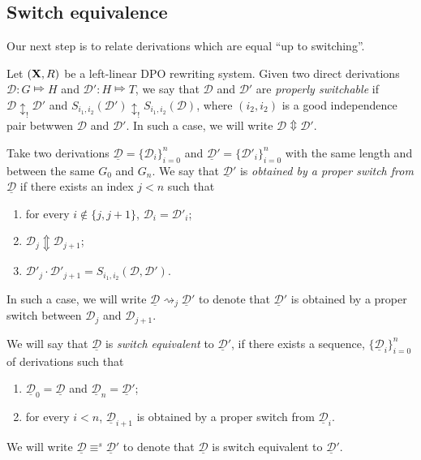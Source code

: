 \documentclass[a4paper,UKenglish,cleveref,pdftex, thm-restate,numberwithinsect]{lipics}
\def\R{\mathsf{R}}
\def\X{\textbf {\textup{X}}}
\newcommand{\dder}[1]{\mathscr{#1}}
\newcommand{\der}[1]{\underline{\dder{#1}}}
\begin{document}
\subsection{Switch equivalence}

Our next step is to relate derivations which are equal ``up to switching''.

\begin{definition}
	\label{de:switchable}
	Let $(\X, \R)$ be a left-linear DPO rewriting system. Given two
	direct derivations $\dder{D}\colon G\Mapsto H$ and
	$\dder{D}'\colon H\Mapsto T$, we say that $\dder{D}$ and $\dder{D}'$
	are \emph{properly switchable} if $\dder{D}\updownarrow_! \dder{D'}$
	and $S_{i_1,i_2}(\dder{D}')\updownarrow_!S_{i_1,i_2}(\dder{D})$,
	where $(i_2,i_2)$ is a good independence pair betwwen $\dder{D}$ and
	$\dder{D}'$. In such a case, we will write
	$\dder{D}\Updownarrow\dder{D}'$.
	
	Take two derivations $\der{D}=\{\dder{D}_{i}\}_{i=0}^n$ and $\der{D}'=\{\dder{D}'_{i}\}_{i=0}^n$ with the same length and between the same $G_0$ and $G_n$. We say that $\der{D}'$ is \emph{obtained by a proper switch from $\der{D}$} if there exists an index $j < n$ such that
	\begin{enumerate}
		\item for every $i\notin \{j, j+1\} $, $\dder{D}_i=\dder{D}'_i$;
		\item $\dder{D}_j \Updownarrow \dder{D}_{j+1}$;		
		\item $\dder{D}'_j\cdot \dder{D}'_{j+1} = S_{i_1,i_2}(\dder{D}, \dder{D}')$.
	\end{enumerate}
	In such a case, we will write $\der{D}\rightsquigarrow_j \der{D}'$ to denote that $\der{D}'$ is obtained by a proper switch between $\dder{D}_j$ and $\dder{D}_{j+1}$. 
	
	We will say that $\der{D}$ is \emph{switch equivalent} to $\der{D}'$, if there exists a sequence, $\{\der{D}_i\}_{i=0}^n$ of derivations such that
	\begin{enumerate}
		\item $\der{D}_0=\der{D}$ and $\der{D}_n=\der{D}'$;
		\item for every $i< n$, $\der{D}_{i+1}$ is obtained by a proper switch from $\der{D}_i$.
	\end{enumerate}
	
	We will write $\der{D} \equiv^s \der{D}'$ to denote that $\der{D}$ is switch equivalent to $\der{D}'$.
\end{definition}
\end{document}
